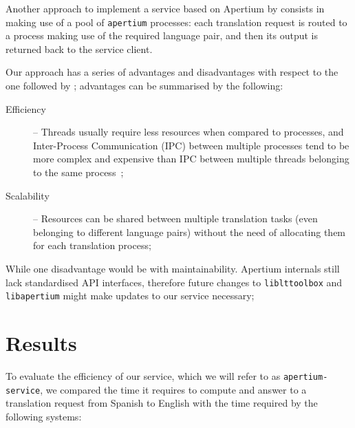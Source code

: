 \documentclass[11pt]{article}
\begin{document}
Another approach to implement a service based on Apertium by \cite{sanchez-cartagena2009scalable} 
consists in making use of a pool of {\tt\small apertium} processes: each translation request is 
routed to a process making use of the required language pair, and then its output is returned 
back to the service client.

Our approach has a series of advantages and disadvantages with respect to the one followed 
by \cite{sanchez-cartagena2009scalable}; advantages can be summarised by the following:

\begin{description}
 \item[Efficiency] -- Threads usually require less resources when compared to processes, and 
    Inter-Process Communication (IPC) between multiple processes tend to be more complex and 
    expensive than IPC between multiple threads belonging to the same process~\citep{tanenbaum};
 \item[Scalability] -- Resources can be shared between multiple translation tasks (even 
    belonging to different language pairs) without the need of allocating them for each 
    translation process;
\end{description}

While one disadvantage would be with maintainability. Apertium internals still lack 
standardised API interfaces, therefore 
future changes to {\small\tt liblttoolbox} and {\small\tt libapertium} might make updates to 
our service necessary;

\section{Results}

To evaluate the efficiency of our service, which we will refer to as {\tt\small apertium-service}, we compared the time it requires to compute and answer to a translation request from Spanish to English with the time required by the following systems:
\end{document}
